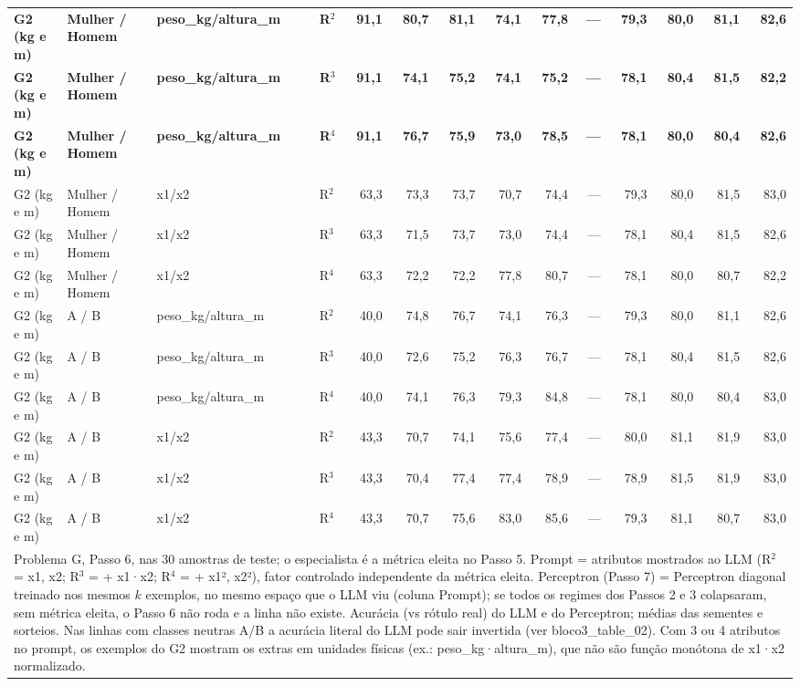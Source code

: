 \begin{table}[htbp]
\begin{tabular}{llllrrrrrrrrrr}
\textbf{G2 (kg e m)} & \textbf{Mulher / Homem} & \textbf{peso\_kg/altura\_m} & \textbf{R$^2$} & \textbf{91,1} & \textbf{80,7} & \textbf{81,1} & \textbf{74,1} & \textbf{77,8} & \textbf{—} & \textbf{79,3} & \textbf{80,0} & \textbf{81,1} & \textbf{82,6} \\
\textbf{G2 (kg e m)} & \textbf{Mulher / Homem} & \textbf{peso\_kg/altura\_m} & \textbf{R$^3$} & \textbf{91,1} & \textbf{74,1} & \textbf{75,2} & \textbf{74,1} & \textbf{75,2} & \textbf{—} & \textbf{78,1} & \textbf{80,4} & \textbf{81,5} & \textbf{82,2} \\
\textbf{G2 (kg e m)} & \textbf{Mulher / Homem} & \textbf{peso\_kg/altura\_m} & \textbf{R$^4$} & \textbf{91,1} & \textbf{76,7} & \textbf{75,9} & \textbf{73,0} & \textbf{78,5} & \textbf{—} & \textbf{78,1} & \textbf{80,0} & \textbf{80,4} & \textbf{82,6} \\
G2 (kg e m) & Mulher / Homem & x1/x2 & R$^2$ & 63,3 & 73,3 & 73,7 & 70,7 & 74,4 & — & 79,3 & 80,0 & 81,5 & 83,0 \\
G2 (kg e m) & Mulher / Homem & x1/x2 & R$^3$ & 63,3 & 71,5 & 73,7 & 73,0 & 74,4 & — & 78,1 & 80,4 & 81,5 & 82,6 \\
G2 (kg e m) & Mulher / Homem & x1/x2 & R$^4$ & 63,3 & 72,2 & 72,2 & 77,8 & 80,7 & — & 78,1 & 80,0 & 80,7 & 82,2 \\
G2 (kg e m) & A / B & peso\_kg/altura\_m & R$^2$ & 40,0 & 74,8 & 76,7 & 74,1 & 76,3 & — & 79,3 & 80,0 & 81,1 & 82,6 \\
G2 (kg e m) & A / B & peso\_kg/altura\_m & R$^3$ & 40,0 & 72,6 & 75,2 & 76,3 & 76,7 & — & 78,1 & 80,4 & 81,5 & 82,6 \\
G2 (kg e m) & A / B & peso\_kg/altura\_m & R$^4$ & 40,0 & 74,1 & 76,3 & 79,3 & 84,8 & — & 78,1 & 80,0 & 80,4 & 83,0 \\
G2 (kg e m) & A / B & x1/x2 & R$^2$ & 43,3 & 70,7 & 74,1 & 75,6 & 77,4 & — & 80,0 & 81,1 & 81,9 & 83,0 \\
G2 (kg e m) & A / B & x1/x2 & R$^3$ & 43,3 & 70,4 & 77,4 & 77,4 & 78,9 & — & 78,9 & 81,5 & 81,9 & 83,0 \\
G2 (kg e m) & A / B & x1/x2 & R$^4$ & 43,3 & 70,7 & 75,6 & 83,0 & 85,6 & — & 79,3 & 81,1 & 80,7 & 83,0 \\
\bottomrule
\multicolumn{14}{p{0.95\linewidth}}{\footnotesize Problema G, Passo 6, nas 30 amostras de teste; o especialista é a métrica eleita no Passo 5. Prompt = atributos mostrados ao LLM (R$^2$ = x1, x2; R$^3$ = + x1·x2; R$^4$ = + x1², x2²), fator controlado independente da métrica eleita. Perceptron (Passo 7) = Perceptron diagonal treinado nos mesmos $k$ exemplos, no mesmo espaço que o LLM viu (coluna Prompt); se todos os regimes dos Passos 2 e 3 colapsaram, sem métrica eleita, o Passo 6 não roda e a linha não existe. Acurácia (vs rótulo real) do LLM e do Perceptron; médias das sementes e sorteios. Nas linhas com classes neutras A/B a acurácia literal do LLM pode sair invertida (ver bloco3\_table\_02). Com 3 ou 4 atributos no prompt, os exemplos do G2 mostram os extras em unidades físicas (ex.: peso\_kg·altura\_m), que não são função monótona de x1·x2 normalizado.} \\
\end{tabular}
\end{table}
